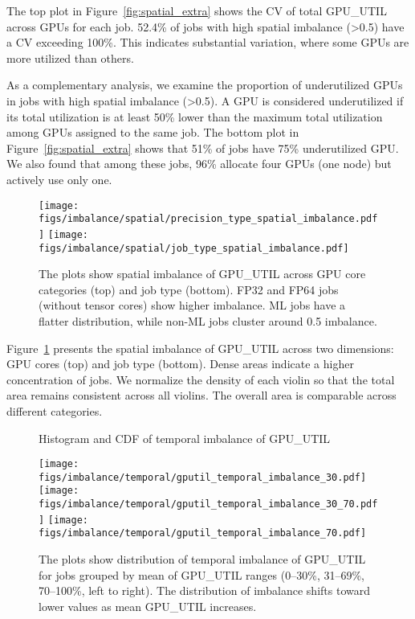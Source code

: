 The top plot in Figure~\ref{fig:spatial_extra} shows the CV of
total GPU\_UTIL across GPUs for each job.
52.4\% of jobs with high spatial imbalance (\textgreater0.5) have a CV exceeding
100\%. This indicates substantial variation, where
some GPUs are more utilized than others.

As a complementary analysis, we
examine the proportion of underutilized GPUs in jobs with high spatial
imbalance (\textgreater0.5). A GPU is considered underutilized if its total
utilization is at least 50\% lower than the maximum total utilization among GPUs
assigned to the same job. The bottom plot in Figure~\ref{fig:spatial_extra} shows
that 51\% of jobs have 75\% underutilized GPU. We also found that among these jobs,
96\% allocate four GPUs (one node) but actively use only one.

\begin{figure}[h]
    \centering
    \texttt{[image: figs/imbalance/spatial/precision\_type\_spatial\_imbalance.pdf]}
    \texttt{[image: figs/imbalance/spatial/job\_type\_spatial\_imbalance.pdf]}
    \caption{The plots show spatial imbalance of GPU\_UTIL
        across GPU core categories (top) and job type (bottom).
        FP32 and FP64 jobs (without tensor cores) show higher imbalance.
        ML jobs have a flatter distribution, while non-ML jobs cluster
        around 0.5 imbalance.}
    \label{fig:spatial_imbalance_type}
\end{figure}

Figure~\ref{fig:spatial_imbalance_type} presents the spatial
imbalance of GPU\_UTIL across two dimensions: GPU cores (top) and job
type (bottom). Dense areas
indicate a higher concentration of jobs. We normalize the
density of each violin so that the total area remains consistent across all
violins. The overall area is comparable across different categories.

\begin{figure*}[t]
    \centering
    Histogram and CDF of temporal imbalance of GPU\_UTIL \par\medskip
    \vspace{-0.05in}
    \texttt{[image: figs/imbalance/temporal/gputil\_temporal\_imbalance\_30.pdf]}
    \texttt{[image: figs/imbalance/temporal/gputil\_temporal\_imbalance\_30\_70.pdf]}
    \texttt{[image: figs/imbalance/temporal/gputil\_temporal\_imbalance\_70.pdf]}
    \caption{The plots show distribution of temporal imbalance of GPU\_UTIL for
        jobs grouped by mean of GPU\_UTIL ranges (0–30\%, 31–69\%, 70–100\%, left to
        right). The distribution of imbalance shifts toward lower values as mean
        GPU\_UTIL increases.}
    \label{fig:gputil_temporal}
\end{figure*}

